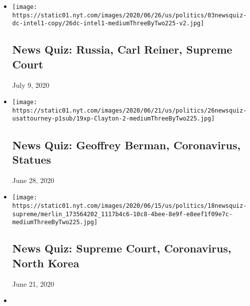 \begin{itemize}
\item
  \href{https://www.nytimes.com/interactive/2020/07/03/briefing/russia-carl-reiner-supreme-court-news-quiz.html}{}

  \texttt{[image: https://static01.nyt.com/images/2020/06/26/us/politics/03newsquiz-dc-intel1-copy/26dc-intel1-mediumThreeByTwo225-v2.jpg]}

  \hypertarget{news-quiz-russia-carl-reiner-supreme-court}{%
  \subsection{News Quiz: Russia, Carl Reiner, Supreme
  Court}\label{news-quiz-russia-carl-reiner-supreme-court}}

  July 9, 2020
\item
  \href{https://www.nytimes.com/interactive/2020/06/26/briefing/geoffrey-berman-coronavirus-statues-news-quiz.html}{}

  \texttt{[image: https://static01.nyt.com/images/2020/06/21/us/politics/26newsquiz-usattourney-p1sub/19xp-Clayton-2-mediumThreeByTwo225.jpg]}

  \hypertarget{news-quiz-geoffrey-berman-coronavirus-statues}{%
  \subsection{News Quiz: Geoffrey Berman, Coronavirus,
  Statues}\label{news-quiz-geoffrey-berman-coronavirus-statues}}

  June 28, 2020
\item
  \href{https://www.nytimes.com/interactive/2020/06/19/briefing/supreme-court-coronavirus-north-korea-news-quiz.html}{}

  \texttt{[image: https://static01.nyt.com/images/2020/06/15/us/politics/18newsquiz-supreme/merlin\_173564202\_1117b4c6-10c8-4bee-8e9f-e8eef1f09e7c-mediumThreeByTwo225.jpg]}

  \hypertarget{news-quiz-supreme-court-coronavirus-north-korea}{%
  \subsection{News Quiz: Supreme Court, Coronavirus, North
  Korea}\label{news-quiz-supreme-court-coronavirus-north-korea}}

  June 21, 2020
\item
  \href{https://www.nytimes.com/interactive/2020/06/12/briefing/world-health-organization-coronavirus-protests-news-quiz.html}{}


\end{itemize}
